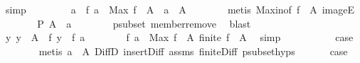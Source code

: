\begin{isabellebody}
\ simp{\isacharplus}{\kern0pt}\ \isanewline
\ \ \ \ \isamarkupfalse%
\ \isamarkupfalse%
\ a\ \ {\isachardoublequoteopen}f\ a\ {\isacharequal}{\kern0pt}\ Max\ {\isacharparenleft}{\kern0pt}f\ {\isacharbackquote}{\kern0pt}\ A{\isacharparenright}{\kern0pt}{\isachardoublequoteclose}\ \ {\isachardoublequoteopen}a\ {\isasymin}\ A{\isachardoublequoteclose}\isanewline
\ \ \ \ \ \ \isamarkupfalse%
\ {\isacharparenleft}{\kern0pt}metis\ Max{\isacharunderscore}{\kern0pt}in{\isacharbrackleft}{\kern0pt}of\ {\isachardoublequoteopen}f\ {\isacharbackquote}{\kern0pt}\ A{\isachardoublequoteclose}{\isacharbrackright}{\kern0pt}\ imageE{\isacharparenright}{\kern0pt}\isanewline
\ \ \ \ \isamarkupfalse%
\ \isamarkupfalse%
\ {\isachardoublequoteopen}P\ {\isacharparenleft}{\kern0pt}A\ {\isacharminus}{\kern0pt}\ {\isacharbraceleft}{\kern0pt}a{\isacharbraceright}{\kern0pt}{\isacharparenright}{\kern0pt}{\isachardoublequoteclose}\isanewline
\ \ \ \ \ \ \isamarkupfalse%
\ psubset\ member{\isacharunderscore}{\kern0pt}remove\ \isamarkupfalse%
\ blast\ \isanewline
\ \ \ \ \isamarkupfalse%
\ \isanewline
\ \ \ \ \isamarkupfalse%
\ {\isachardoublequoteopen}{\isasymAnd}y{\isachardot}{\kern0pt}\ y\ {\isasymin}\ A\ {\isasymLongrightarrow}\ f\ y\ {\isasymle}\ f\ a{\isachardoublequoteclose}\isanewline
\ \ \ \ \ \ \isamarkupfalse%
\ {\isacartoucheopen}f\ a\ {\isacharequal}{\kern0pt}\ Max\ {\isacharparenleft}{\kern0pt}f\ {\isacharbackquote}{\kern0pt}\ A{\isacharparenright}{\kern0pt}{\isacartoucheclose}\ {\isacartoucheopen}finite\ {\isacharparenleft}{\kern0pt}f\ {\isacharbackquote}{\kern0pt}\ A{\isacharparenright}{\kern0pt}{\isacartoucheclose}\ \isamarkupfalse%
\ simp\isanewline
\ \ \ \ \isamarkupfalse%
\isanewline
\ \ \ \ \isamarkupfalse%
\ {\isacharquery}{\kern0pt}case\isanewline
\ \ \ \ \ \ \isamarkupfalse%
\ {\isacharparenleft}{\kern0pt}metis\ {\isacartoucheopen}a\ {\isasymin}\ A{\isacartoucheclose}\ DiffD{}\ insert{\isacharunderscore}{\kern0pt}Diff\ assms{\isacharparenleft}{\kern0pt}{}{\isacharparenright}{\kern0pt}\ finite{\isacharunderscore}{\kern0pt}Diff\ psubset{\isachardot}{\kern0pt}hyps{\isacharparenright}{\kern0pt}\isanewline
\ \ \isacommand{{\isacharbraceright}{\kern0pt}}\isamarkupfalse%
\isanewline
\ \ \isamarkupfalse%
\ {\isacharquery}{\kern0pt}case\isanewline
\ \ \ \ \isamarkupfalse%

\end{isabellebody}
